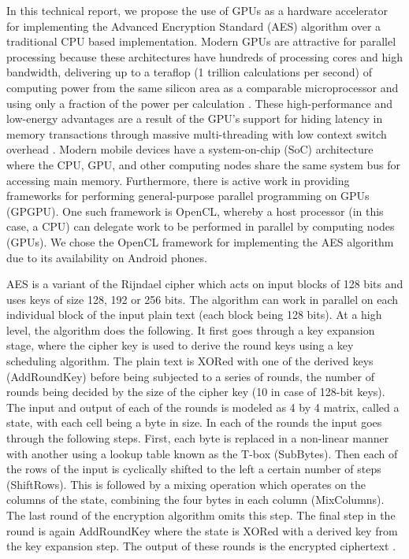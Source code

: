 \documentclass[conference,10pt]{IEEEtran}
\begin{document}
In this technical report, we propose the use of GPUs as a hardware accelerator for implementing the 
Advanced Encryption Standard (AES) algorithm over a traditional CPU based implementation.  Modern GPUs are 
attractive for parallel processing because these architectures have hundreds of processing cores and high 
bandwidth, delivering up to a teraflop (1 trillion calculations per second) of computing power from the 
same silicon area as a comparable microprocessor and using only a fraction of the power per calculation 
\cite{myth}. These high-performance and low-energy advantages are a result of the GPU's support for hiding 
latency in memory transactions through massive multi-threading with low context switch overhead 
\cite{aes_gpu}.  Modern mobile devices have a system-on-chip (SoC) architecture where the CPU, GPU, and 
other computing nodes share the same system bus for accessing main memory. Furthermore, there is active 
work in providing frameworks for performing general-purpose parallel programming on GPUs (GPGPU).  One such 
framework is OpenCL, whereby a host processor (in this case, a CPU) can delegate work to be performed in 
parallel by computing nodes (GPUs).  We chose the OpenCL framework for implementing the AES algorithm due 
to its availability on Android phones.

AES is a variant of the Rijndael cipher which acts on input blocks of 128 bits and uses keys of size 128, 
192 or 256 bits. The algorithm can work in parallel on each individual block of the input plain text (each 
block being 128 bits). At a high level, the algorithm does the following. It first goes through a key 
expansion stage, where the cipher key is used to derive the round keys using a key scheduling algorithm. 
The plain text is XORed with one of the derived keys (AddRoundKey) before being subjected to a series of 
rounds, the number of rounds being decided by the size of the cipher key (10 in case of 128-bit keys). The 
input and output of each of the rounds is modeled as 4 by 4 matrix, called a state, with each cell being a 
byte in size. In each of the rounds the input goes through the following steps. First, each byte is 
replaced in a non-linear manner with another using a lookup table known as the T-box (SubBytes). Then each 
of the rows of the input is cyclically shifted to the left a certain number of steps (ShiftRows). This is 
followed by a mixing operation which operates on the columns of the state, combining the four bytes in each 
column (MixColumns). The last round of the encryption algorithm omits this step. The final step in the 
round is again AddRoundKey where the state is XORed with a derived key from the key expansion step. The 
output of these rounds is the encrypted ciphertext \cite{aes1,aes2}.
\end{document}
